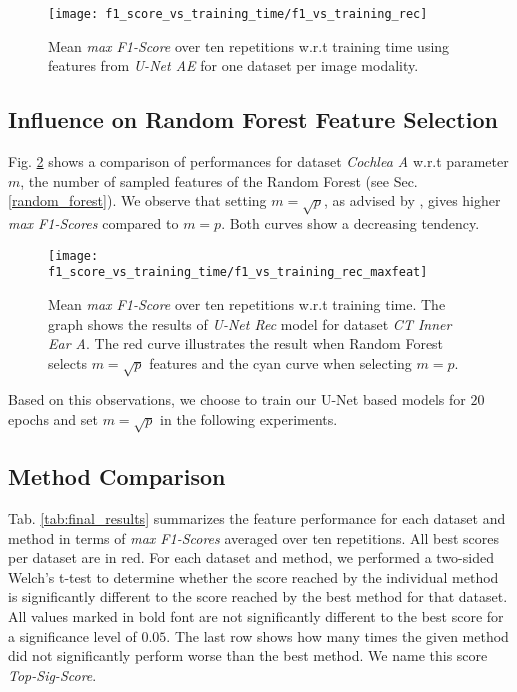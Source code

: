 \begin{figure}[!htbp]
  \centering
  {
    \texttt{[image: f1\_score\_vs\_training\_time/f1\_vs\_training\_rec]}
  }
  \caption[Feature quality vs training time of U-Net Rec model]{Mean \textit{max F1-Score} over ten repetitions w.r.t training time using features from \textit{U-Net AE} for one dataset per image modality.}
  \label{fig:perf_vs_training}
\end{figure}

\clearpage
\subsection{Influence on Random Forest Feature Selection} \label{sec:infl_feat_selection}
Fig. \ref{fig:perf_vs_training_maxfeat} shows a comparison of performances for dataset \textit{Cochlea A} w.r.t parameter $m$, the number of sampled features of the Random Forest (see Sec. \ref{random_forest}).
We observe that setting $m=\sqrt{p}$, as advised by \cite[Ch. 15]{hastie09}, gives higher \textit{max F1-Scores} compared to $m=p$.
Both curves show a decreasing tendency.
\vspace{10pt}

\begin{figure}[!htbp]
  \centering
  {
    \texttt{[image: f1\_score\_vs\_training\_time/f1\_vs\_training\_rec\_maxfeat]}
  }
  \caption[Feature quality vs training time of U-Net Rec model]{Mean \textit{max F1-Score} over ten repetitions w.r.t training time. The graph shows the results of \textit{U-Net Rec} model for dataset \textit{CT Inner Ear A}. The red curve illustrates the result when Random Forest selects $m=\sqrt{p}$ features and the cyan curve when selecting $m=p$.}
  \label{fig:perf_vs_training_maxfeat}
\end{figure}

Based on this observations, we choose to train our U-Net based models for $20$ epochs and set $m=\sqrt{p}$ in the following experiments.
\vspace{20pt}

\subsection{Method Comparison}
Tab. \ref{tab:final_results} summarizes the feature performance for each dataset and method in terms of \textit{max F1-Scores} averaged over ten repetitions.
All best scores per dataset are in red.
For each dataset and method, we performed a two-sided Welch's t-test \cite{welch47} to determine whether the score reached by the individual method is significantly different to the score reached by the best method for that dataset.
All values marked in bold font are not significantly different to the best score for a significance level of $0.05$.
The last row shows how many times the given method did not significantly perform worse than the best method.
We name this score \textit{Top-Sig-Score}.

